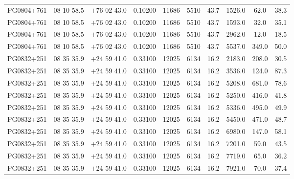 \begin{landscape}
\begin{center}
\begin{longtable}{l c c c c c c c c c}
PG0804+761  &              08 10 58.5  &         $+$76 02 43.0  &       0.10200  & 11686  &   5510  &       43.7  &      1526.0  &  62.0  &   38.3  \\
PG0804+761  &              08 10 58.5  &         $+$76 02 43.0  &       0.10200  & 11686  &   5510  &       43.7  &      1593.0  &  32.0  &   35.1  \\
PG0804+761  &              08 10 58.5  &         $+$76 02 43.0  &       0.10200  & 11686  &   5510  &       43.7  &      2962.0  &  12.0  &   18.5  \\
PG0804+761  &              08 10 58.5  &         $+$76 02 43.0  &       0.10200  & 11686  &   5510  &       43.7  &      5537.0  &  349.0  &  50.0  \\
PG0832+251  &              08 35 35.9  &         $+$24 59 41.0  &       0.33100  & 12025  &   6134  &       16.2  &      2183.0  &  208.0  &  30.5  \\
PG0832+251  &              08 35 35.9  &         $+$24 59 41.0  &       0.33100  & 12025  &   6134  &       16.2  &      3536.0  &  124.0  &  87.3  \\
PG0832+251  &              08 35 35.9  &         $+$24 59 41.0  &       0.33100  & 12025  &   6134  &       16.2  &      5208.0  &  681.0  &  78.6  \\
PG0832+251  &              08 35 35.9  &         $+$24 59 41.0  &       0.33100  & 12025  &   6134  &       16.2  &      5250.0  &  416.0  &  41.8  \\
PG0832+251  &              08 35 35.9  &         $+$24 59 41.0  &       0.33100  & 12025  &   6134  &       16.2  &      5336.0  &  495.0  &  49.9  \\
PG0832+251  &              08 35 35.9  &         $+$24 59 41.0  &       0.33100  & 12025  &   6134  &       16.2  &      5450.0  &  471.0  &  48.7  \\
PG0832+251  &              08 35 35.9  &         $+$24 59 41.0  &       0.33100  & 12025  &   6134  &       16.2  &      6980.0  &  147.0  &  58.1  \\
PG0832+251  &              08 35 35.9  &         $+$24 59 41.0  &       0.33100  & 12025  &   6134  &       16.2  &      7201.0  &  59.0  &   43.5  \\
PG0832+251  &              08 35 35.9  &         $+$24 59 41.0  &       0.33100  & 12025  &   6134  &       16.2  &      7719.0  &  65.0  &   36.2  \\
PG0832+251  &              08 35 35.9  &         $+$24 59 41.0  &       0.33100  & 12025  &   6134  &       16.2  &      7921.0  &  70.0  &   37.4  \\

\end{longtable}
\end{center}
\end{landscape}
